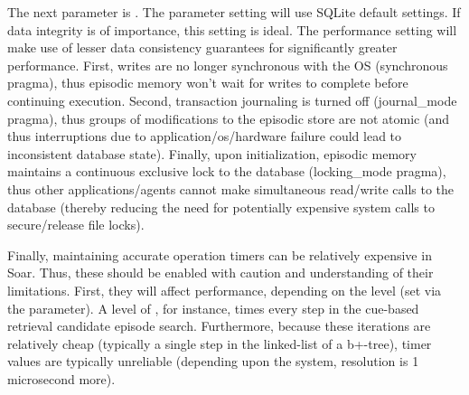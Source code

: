 The next parameter is .  
The  parameter setting will use SQLite default settings.  
If data integrity is of importance, this setting is ideal.  
The performance setting will make use of lesser data consistency guarantees for significantly greater performance.  
First, writes are no longer synchronous with the OS (synchronous pragma), thus episodic memory won't wait for writes to complete before continuing execution.  
Second, transaction journaling is turned off (journal\_mode pragma), thus groups of modifications to the episodic store are not atomic (and thus interruptions due to application/os/hardware failure could lead to inconsistent database state).  
Finally, upon initialization, episodic memory maintains a continuous exclusive lock to the database (locking\_mode pragma), thus other applications/agents cannot make simultaneous read/write calls to the database (thereby reducing the need for potentially expensive system calls to secure/release file locks).

Finally, maintaining accurate operation timers can be relatively expensive in Soar.  
Thus, these should be enabled with caution and understanding of their limitations.  
First, they will affect performance, depending on the level (set via the  parameter).  
A level of , for instance, times every step in the cue-based retrieval candidate episode search.  
Furthermore, because these iterations are relatively cheap (typically a single step in the linked-list of a b+-tree), timer values are typically unreliable (depending upon the system, resolution is 1 microsecond more).

